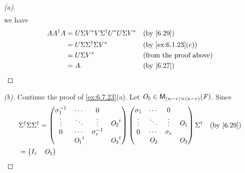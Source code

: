 \begin{proof}[(a)]
\begin{align*}
  \end{align*}
  we have
  \begin{align*}
    A A^{\dag} A & = U \Sigma V^* V \Sigma^{\dag} U^* U \Sigma V^* &  & \by{6.29}                     \\
                 & = U \Sigma \Sigma^{\dag} \Sigma V^*             &  & \by{ex:6.1.23}[c]             \\
                 & = U \Sigma V^*                                  &  & \text{(from the proof above)} \\
                 & = A.                                            &  & \by{6.27}
  \end{align*}
\end{proof}

\begin{proof}[(b)]
  Continue the proof of \cref{ex:6.7.23}(a). Let \(\zm_5 \in \ms[(n-r)][(n-r)][\F]\).
  Since
  \begin{align*}
     & \Sigma^{\dag} \Sigma \Sigma^{\dag} = \begin{pmatrix}
                                              \sigma_1^{-1} & \cdots     & 0             &            \\
                                              \vdots        & \ddots     & \vdots        & \tp{\zm_2} \\
                                              0             & \cdots     & \sigma_r^{-1} &            \\
                                                            & \tp{\zm_1} &               & \tp{\zm_3}
                                            \end{pmatrix} \begin{pmatrix}
                                                            \sigma_1 & \cdots & 0        &       \\
                                                            \vdots   & \ddots & \vdots   & \zm_1 \\
                                                            0        & \cdots & \sigma_r &       \\
                                                                     & \zm_2  &          & \zm_3
                                                          \end{pmatrix} \Sigma^{\dag} &  & \by{6.29} \\
     & = \begin{pmatrix}
           I_r        & \zm_1 \\

\end{pmatrix}
\end{align*}
\end{proof}
